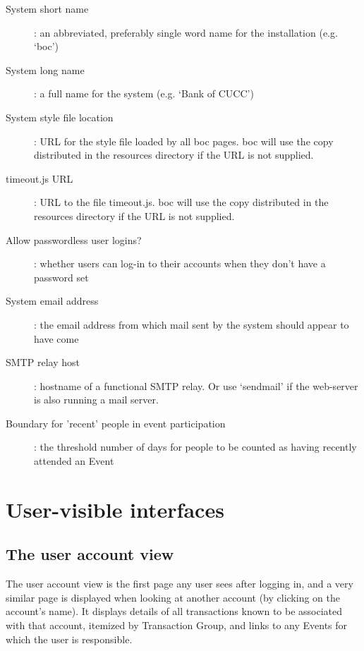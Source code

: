 \documentclass{report}
\begin{document}
\begin{description}
\item[System short name]: an abbreviated, preferably single word name for the installation (e.g. `boc')

\item[System long name]: a full name for the system (e.g. `Bank of CUCC')

\item[System style file location]: URL for the style file loaded by all boc pages.  boc will use the copy distributed in the resources directory if the URL is not supplied.

\item[timeout.js URL]: URL to the file timeout.js.  boc will use the copy distributed in the resources directory if the URL is not supplied.

\item[Allow passwordless user logins?]: whether users can log-in to their accounts when they don't have a password set

\item[System email address]: the email address from which mail sent by the system should appear to have come

\item[SMTP relay host]: hostname of a functional SMTP relay.  Or use `sendmail' if the web-server is also running a mail server.

\item[Boundary for 'recent' people in event participation]: the threshold number of days for people to be counted as having recently attended an Event
\end{description}

\chapter{User-visible interfaces}

\section{The user account view}

The user account view is the first page any user sees after logging in, and a very similar page is displayed when looking at another account (by clicking on the account's name).  It displays details of all transactions known to be associated with that account, itemized by Transaction Group, and links to any Events for which the user is responsible.
\end{document}

